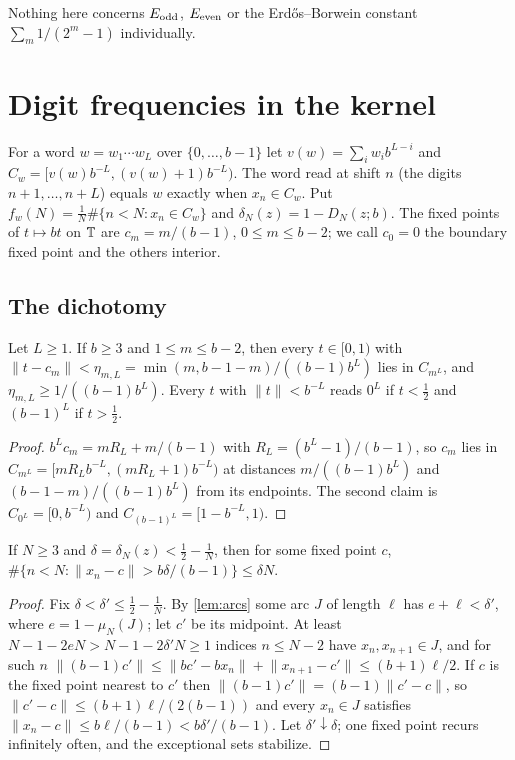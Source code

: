\documentclass[11pt]{article}
\newcommand{\dist}[1]{\lVert #1\rVert}
\newcommand{\cnt}{\#}
\begin{document}
Nothing here concerns $E_{\rm odd}$, $E_{\rm even}$ or the Erd\H{o}s--Borwein constant
$\sum_m1/(2^m-1)$ individually.

\section{Digit frequencies in the kernel}\label{sec:digits}

For a word $w=w_1\cdots w_L$ over $\{0,\dots,b-1\}$ let $v(w)=\sum_iw_ib^{L-i}$ and
$C_w=[v(w)b^{-L},(v(w)+1)b^{-L})$. The word read at shift $n$ (the digits $n+1,\dots,n+L$) equals
$w$ exactly when $x_n\in C_w$. Put $f_w(N)=\frac1N\cnt\{n<N:x_n\in C_w\}$ and
$\delta_N(z)=1-D_N(z;b)$. The fixed points of $t\mapsto bt$ on $\mathbb T$ are $c_m=m/(b-1)$,
$0\le m\le b-2$; we call $c_0=0$ the boundary fixed point and the others interior.

\subsection{The dichotomy}\label{subsec:dichotomy}

\begin{lemma}\label{lem:fixedcyl}
Let $L\ge1$. If $b\ge3$ and $1\le m\le b-2$, then every $t\in[0,1)$ with
$\dist{t-c_m}<\eta_{m,L}=\min(m,b-1-m)/((b-1)b^L)$ lies in $C_{m^L}$, and
$\eta_{m,L}\ge1/((b-1)b^L)$. Every $t$ with $\dist t<b^{-L}$ reads $0^L$ if $t<\frac12$ and
$(b-1)^L$ if $t>\frac12$.
\end{lemma}

\begin{proof}
$b^Lc_m=mR_L+m/(b-1)$ with $R_L=(b^L-1)/(b-1)$, so $c_m$ lies in $C_{m^L}=[mR_Lb^{-L},(mR_L+1)b^{-L})$
at distances $m/((b-1)b^L)$ and $(b-1-m)/((b-1)b^L)$ from its endpoints. The second claim is
$C_{0^L}=[0,b^{-L})$ and $C_{(b-1)^L}=[1-b^{-L},1)$.
\end{proof}

\begin{lemma}[Localization]\label{lem:localize}
If $N\ge3$ and $\delta=\delta_N(z)<\frac12-\frac1N$, then for some fixed point $c$,
$\cnt\{n<N:\dist{x_n-c}>b\delta/(b-1)\}\le\delta N$.
\end{lemma}

\begin{proof}
Fix $\delta<\delta'\le\frac12-\frac1N$. By \cref{lem:arcs} some arc $J$ of length $\ell$ has
$e+\ell<\delta'$, where $e=1-\mu_N(J)$; let $c'$ be its midpoint. At least
$N-1-2eN>N-1-2\delta'N\ge1$ indices $n\le N-2$ have $x_n,x_{n+1}\in J$, and for such $n$
$\dist{(b-1)c'}\le\dist{bc'-bx_n}+\dist{x_{n+1}-c'}\le(b+1)\ell/2$. If $c$ is the fixed point nearest
to $c'$ then $\dist{(b-1)c'}=(b-1)\dist{c'-c}$, so $\dist{c'-c}\le(b+1)\ell/(2(b-1))$ and every
$x_n\in J$ satisfies $\dist{x_n-c}\le b\ell/(b-1)<b\delta'/(b-1)$. Let $\delta'\downarrow\delta$;
one fixed point recurs infinitely often, and the exceptional sets stabilize.
\end{proof}
\end{document}
